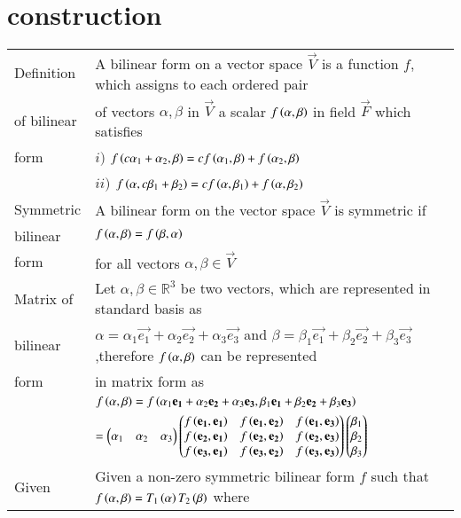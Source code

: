 \documentclass[journal,12pt]{IEEEtran}
\begin{document}
\section{construction}
\renewcommand{\thetable}{1}
\begin{longtable}{|l|l|}
    \hline
    Definition&A bilinear form on a vector space $\vec{V}$ is a function $f$, which assigns to each ordered pair\\
    of bilinear&of vectors $\alpha,\beta$ in $\vec{V}$ a scalar $f\left(\alpha,\beta\right)$ in field $\vec{F}$ which satisfies\\
    form&\qquad \qquad $i)$ $f\left(c\alpha_1+\alpha_2,\beta\right)=cf\left(\alpha_1,\beta\right)+f\left(\alpha_2,\beta\right)$\\
    &\qquad \qquad $ii)$ $f\left(\alpha,c\beta_1+\beta_2\right)=cf\left(\alpha,\beta_1\right)+f\left(\alpha,\beta_2\right)$\\
    \hline
    Symmetric&A bilinear form on the vector space $\vec{V}$ is symmetric if\\
    bilinear&\qquad \qquad \qquad $f\left(\alpha,\beta\right)=f\left(\beta,\alpha\right)$\\
    form& for all vectors $\alpha,\beta\in\vec{V}$\\
    \hline
    Matrix of &Let $\alpha,\beta\in\mathbb{R}^3$ be two vectors, which are represented in standard basis as\\
    bilinear&$\alpha=\alpha_1\vec{e_1}+\alpha_2\vec{e_2}+\alpha_3\vec{e_3}$ and $\beta=\beta_1\vec{e_1}+\beta_2\vec{e_2}+\beta_3\vec{e_3}$,therefore $f\left(\alpha,\beta\right)$ can be represented \\
    form&in matrix form as\\
    &$f\left(\alpha,\beta\right)=f\left(\alpha_1\mathbf{e_1}+\alpha_2\mathbf{e_2}+\alpha_3\mathbf{e_3},\beta_1\mathbf{e_1}+\beta_2\mathbf{e_2}+\beta_3\mathbf{e_3}\right)$\\
    &$=\begin{pmatrix}\alpha_1&\alpha_2&\alpha_3\end{pmatrix}\begin{pmatrix}f\left(\mathbf{e_1},\mathbf{e_1}\right)&f\left(\mathbf{e_1},\mathbf{e_2}\right)&f\left(\mathbf{e_1},\mathbf{e_3}\right)\\f\left(\mathbf{e_2},\mathbf{e_1}\right)&f\left(\mathbf{e_2},\mathbf{e_2}\right)&f\left(\mathbf{e_2},\mathbf{e_3}\right)\\f\left(\mathbf{e_3},\mathbf{e_1}\right)&f\left(\mathbf{e_3},\mathbf{e_2}\right)&f\left(\mathbf{e_3},\mathbf{e_3}\right)\end{pmatrix}\begin{pmatrix}\beta_1\\\beta_2\\\beta_3\end{pmatrix}$\\
    \hline
    Given &Given a non-zero symmetric bilinear form $f$ such that $f\left(\alpha,\beta\right)=T_1\left(\alpha\right)T_2\left(\beta\right)$ where\\

\end{longtable}
\end{document}
